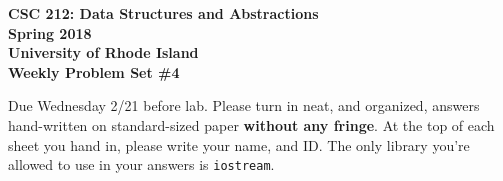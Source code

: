\documentclass[11pt]{article}
\begin{document}
    \thispagestyle{empty}
    
    \begin{center}
        {\Large\bf CSC 212: Data Structures and Abstractions}\\
        \medskip
        {\Large\bf Spring 2018}\\
        \medskip
        {\Large\bf University of Rhode Island}\\
        \bigskip
        {\Large\bf Weekly Problem Set \#4}
    \end{center}
    
    Due Wednesday 2/21 before lab. Please turn in neat, and organized, answers hand-written on standard-sized paper \textbf{without any fringe}. At the top of each sheet you hand in, please write your name, and ID.
    The only library you're allowed to use in your answers is \verb|iostream|.
    
\end{document}
